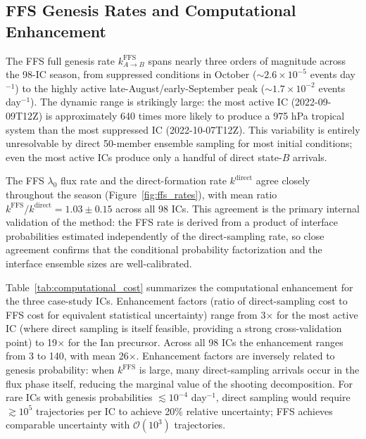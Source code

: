 \documentclass[11pt]{article}
\begin{document}
\subsection{FFS Genesis Rates and Computational Enhancement}

The FFS full genesis rate $k_{A\to B}^{\text{FFS}}$ spans nearly three orders of magnitude across the 98-IC season, from suppressed conditions in October ($\sim 2.6\times10^{-5}$ events day$^{-1}$) to the highly active late-August/early-September peak ($\sim 1.7\times10^{-2}$ events day$^{-1}$). The dynamic range is strikingly large: the most active IC (2022-09-09T12Z) is approximately 640 times more likely to produce a 975 hPa tropical system than the most suppressed IC (2022-10-07T12Z). This variability is entirely unresolvable by direct 50-member ensemble sampling for most initial conditions; even the most active ICs produce only a handful of direct state-$B$ arrivals.

The FFS $\lambda_0$ flux rate and the direct-formation rate $k^{\text{direct}}$ agree closely throughout the season (Figure~\ref{fig:ffs_rates}), with mean ratio $k^{\text{FFS}}/k^{\text{direct}} = 1.03 \pm 0.15$ across all 98 ICs. This agreement is the primary internal validation of the method: the FFS rate is derived from a product of interface probabilities estimated independently of the direct-sampling rate, so close agreement confirms that the conditional probability factorization and the interface ensemble sizes are well-calibrated.

Table~\ref{tab:computational_cost} summarizes the computational enhancement for the three case-study ICs. Enhancement factors (ratio of direct-sampling cost to FFS cost for equivalent statistical uncertainty) range from 3$\times$ for the most active IC (where direct sampling is itself feasible, providing a strong cross-validation point) to 19$\times$ for the Ian precursor. Across all 98 ICs the enhancement ranges from 3 to 140, with mean 26$\times$. Enhancement factors are inversely related to genesis probability: when $k^{\text{FFS}}$ is large, many direct-sampling arrivals occur in the flux phase itself, reducing the marginal value of the shooting decomposition. For rare ICs with genesis probabilities $\lesssim 10^{-4}$ day$^{-1}$, direct sampling would require $\gtrsim 10^5$ trajectories per IC to achieve 20\% relative uncertainty; FFS achieves comparable uncertainty with $\mathcal{O}(10^3)$ trajectories.
\end{document}
